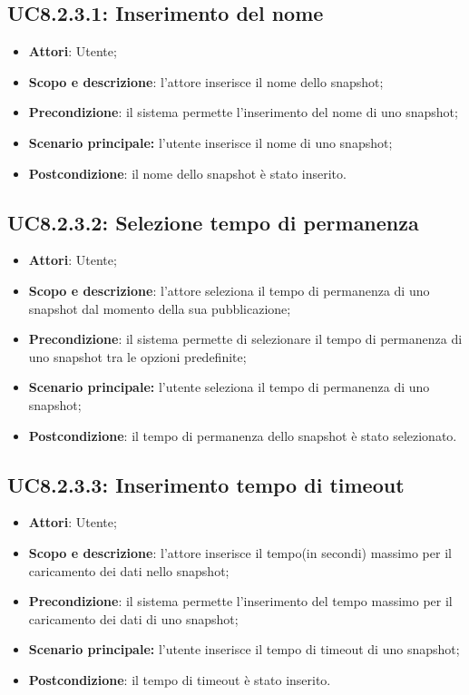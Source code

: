 \subsection{UC8.2.3.1: Inserimento del nome}
\hypertarget{UC8.2.3.1}{}
\begin{itemize}
	\item \textbf{Attori}: Utente;
	\item \textbf{Scopo e descrizione}: l'attore inserisce il nome dello snapshot;
	\item \textbf{Precondizione}: il sistema permette l'inserimento del nome di uno snapshot;
	\item \textbf{Scenario principale:} l'utente inserisce il nome di uno snapshot;
	\item \textbf{Postcondizione}: il nome dello snapshot è stato inserito.
\end{itemize}

\subsection{UC8.2.3.2: Selezione tempo di permanenza}
\hypertarget{UC8.2.3.2}{}
\begin{itemize}
	\item \textbf{Attori}: Utente;
	\item \textbf{Scopo e descrizione}: l'attore seleziona il tempo di permanenza di uno snapshot dal momento della sua pubblicazione;
	\item \textbf{Precondizione}: il sistema permette di selezionare il tempo di permanenza di uno snapshot tra le opzioni predefinite;
	\item \textbf{Scenario principale:} l'utente seleziona il tempo di permanenza di uno snapshot;
	\item \textbf{Postcondizione}: il tempo di permanenza dello snapshot è stato selezionato.
\end{itemize}

\subsection{UC8.2.3.3: Inserimento tempo di timeout}
\hypertarget{UC8.2.3.3}{}
\begin{itemize}
	\item \textbf{Attori}: Utente;
	\item \textbf{Scopo e descrizione}: l'attore inserisce il tempo(in secondi) massimo per il caricamento dei dati nello snapshot;
	\item \textbf{Precondizione}: il sistema permette l'inserimento del tempo massimo per il caricamento dei dati di uno snapshot;
	\item \textbf{Scenario principale:} l'utente inserisce il tempo di timeout di uno snapshot;
	\item \textbf{Postcondizione}: il tempo di timeout è stato inserito.
\end{itemize}

